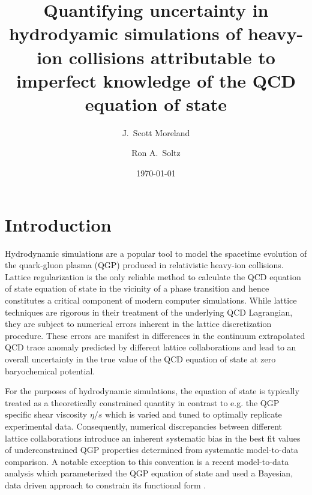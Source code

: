 \documentclass[aps,prc,reprint,amsmath,nofootinbib,superscriptaddress]{revtex4-1}
\begin{document}
\title{Quantifying uncertainty in hydrodyamic simulations of heavy-ion collisions attributable to imperfect knowledge of the QCD equation of state}

\author{J.\ Scott Moreland}
\author{Ron A.\ Soltz}

\date{\today}

\begin{abstract} 
   
\end{abstract}

\maketitle

\section{Introduction}

Hydrodynamic simulations are a popular tool to model the spacetime evolution of the quark-gluon plasma (QGP) produced in relativistic heavy-ion collisions.
Lattice regularization is the only reliable method to calculate the QCD equation of state equation of state in the vicinity of a phase transition and hence 
constitutes a critical component of modern computer simulations. While lattice techniques are rigorous in their treatment of the underlying QCD Lagrangian, 
they are subject to numerical errors inherent in the lattice discretization procedure. These errors are manifest in differences in the continuum extrapolated QCD 
trace anomaly predicted by different lattice collaborations and lead to an overall uncertainty in the true value of the QCD equation of state at zero baryochemical 
potential.

For the purposes of hydrodynamic simulations, the equation of state is typically treated as a theoretically constrained quantity in contrast to e.g. the
QGP specific shear viscosity $\eta/s$ which is varied and tuned to optimally replicate experimental data. Consequently, numerical discrepancies between different 
lattice collaborations introduce an inherent systematic bias in the best fit values of underconstrained QGP properties determined from systematic model-to-data comparison. 
A notable exception to this convention is a recent model-to-data analysis which parameterized the QGP equation of state and used a Bayesian, data driven approach 
to constrain its functional form \cite{Novak:2013bqa}. 
\end{document}
